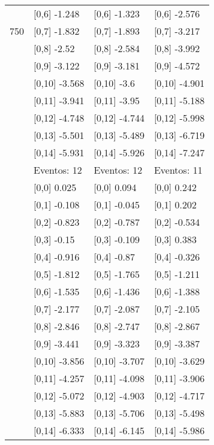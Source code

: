 \begin{table}
\begin{tabular}[t]{llll}
 & {}[0,6] -1.248 & {}[0,6] -1.323 & {}[0,6] -2.576\\
750 & {}[0,7] -1.832 & {}[0,7] -1.893 & {}[0,7] -3.217\\
\addlinespace
 & {}[0,8] -2.52 & {}[0,8] -2.584 & {}[0,8] -3.992\\
 & {}[0,9] -3.122 & {}[0,9] -3.181 & {}[0,9] -4.572\\
 & {}[0,10] -3.568 & {}[0,10] -3.6 & {}[0,10] -4.901\\
 & {}[0,11] -3.941 & {}[0,11] -3.95 & {}[0,11] -5.188\\
 & {}[0,12] -4.748 & {}[0,12] -4.744 & {}[0,12] -5.998\\
\addlinespace
 & {}[0,13] -5.501 & {}[0,13] -5.489 & {}[0,13] -6.719\\
 & {}[0,14] -5.931 & {}[0,14] -5.926 & {}[0,14] -7.247\\
 & Eventos:  12 & Eventos:  12 & Eventos:  11\\
 & {}[0,0] 0.025 & {}[0,0] 0.094 & {}[0,0] 0.242\\
 & {}[0,1] -0.108 & {}[0,1] -0.045 & {}[0,1] 0.202\\
\addlinespace
 & {}[0,2] -0.823 & {}[0,2] -0.787 & {}[0,2] -0.534\\
 & {}[0,3] -0.15 & {}[0,3] -0.109 & {}[0,3] 0.383\\
 & {}[0,4] -0.916 & {}[0,4] -0.87 & {}[0,4] -0.326\\
 & {}[0,5] -1.812 & {}[0,5] -1.765 & {}[0,5] -1.211\\
 & {}[0,6] -1.535 & {}[0,6] -1.436 & {}[0,6] -1.388\\
\addlinespace
1000 & {}[0,7] -2.177 & {}[0,7] -2.087 & {}[0,7] -2.105\\
 & {}[0,8] -2.846 & {}[0,8] -2.747 & {}[0,8] -2.867\\
 & {}[0,9] -3.441 & {}[0,9] -3.323 & {}[0,9] -3.387\\
 & {}[0,10] -3.856 & {}[0,10] -3.707 & {}[0,10] -3.629\\
 & {}[0,11] -4.257 & {}[0,11] -4.098 & {}[0,11] -3.906\\
\addlinespace
 & {}[0,12] -5.072 & {}[0,12] -4.903 & {}[0,12] -4.717\\
 & {}[0,13] -5.883 & {}[0,13] -5.706 & {}[0,13] -5.498\\
 & {}[0,14] -6.333 & {}[0,14] -6.145 & {}[0,14] -5.986\\
\bottomrule
\end{tabular}
\end{table}
